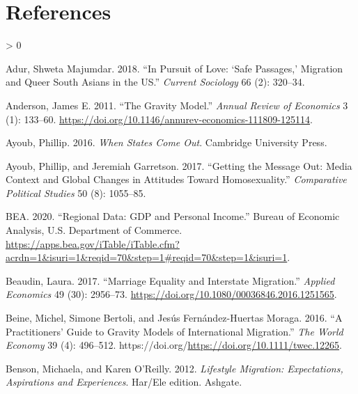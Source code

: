 \documentclass[
  11pt,
]{article}
\newlength{\cslhangindent}
\newenvironment{CSLReferences}[2] %
 {%
  \setlength{\parindent}{0pt}
  \ifodd #1 \everypar{\setlength{\hangindent}{\cslhangindent}}\ignorespaces\fi
  \ifnum #2 > 0
  \setlength{\parskip}{#2\baselineskip}
  \fi
 }%
 {}
\begin{document}
\hypertarget{references}{%
\section{References}\label{references}}

\setlength{\parindent}{-0.2in}
\setlength{\leftskip}{0.2in}
\setlength{\parskip}{8pt}

\noindent

\hypertarget{refs}{}
\begin{CSLReferences}{1}{0}
\leavevmode\hypertarget{ref-adur_2018}{}%
Adur, Shweta Majumdar. 2018. {``In Pursuit of Love: {`{Safe} Passages,'} Migration and Queer {South} {Asians} in the {US}.''} \emph{Current Sociology} 66 (2): 320--34.

\leavevmode\hypertarget{ref-anderson_2011}{}%
Anderson, James E. 2011. {``The {Gravity} {Model}.''} \emph{Annual Review of Economics} 3 (1): 133--60. \url{https://doi.org/10.1146/annurev-economics-111809-125114}.

\leavevmode\hypertarget{ref-ayoub_2016}{}%
Ayoub, Phillip. 2016. \emph{When {States} {Come} {Out}}. Cambridge University Press.

\leavevmode\hypertarget{ref-ayoub_2017}{}%
Ayoub, Phillip, and Jeremiah Garretson. 2017. {``Getting the Message Out: {Media} Context and Global Changes in Attitudes Toward Homosexuality.''} \emph{Comparative Political Studies} 50 (8): 1055--85.

\leavevmode\hypertarget{ref-bea_2020}{}%
BEA. 2020. {``Regional {Data}: {GDP} and {Personal} {Income}.''} Bureau of Economic Analysis, U.S. Department of Commerce. \url{https://apps.bea.gov/iTable/iTable.cfm?acrdn=1\&isuri=1\&reqid=70\&step=1\#reqid=70\&step=1\&isuri=1}.

\leavevmode\hypertarget{ref-beaudin_2017}{}%
Beaudin, Laura. 2017. {``Marriage Equality and Interstate Migration.''} \emph{Applied Economics} 49 (30): 2956--73. \url{https://doi.org/10.1080/00036846.2016.1251565}.

\leavevmode\hypertarget{ref-beine_2016}{}%
Beine, Michel, Simone Bertoli, and Jesús Fernández-Huertas Moraga. 2016. {``A {Practitioners}' {Guide} to {Gravity} {Models} of {International} {Migration}.''} \emph{The World Economy} 39 (4): 496--512. https://doi.org/\url{https://doi.org/10.1111/twec.12265}.

\leavevmode\hypertarget{ref-benson_2012}{}%
Benson, Michaela, and Karen O'Reilly. 2012. \emph{Lifestyle {Migration}: {Expectations}, {Aspirations} and {Experiences}}. Har/Ele edition. Ashgate.


\end{CSLReferences}
\end{document}
